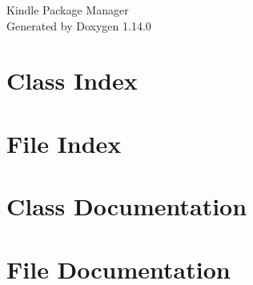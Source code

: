 \documentclass[twoside]{book}
\newcommand{\+}{\discretionary{\mbox{\scriptsize$\hookleftarrow$}}{}{}}
\newcommand{\clearemptydoublepage}{%
    \newpage{\pagestyle{empty}\cleardoublepage}%
  }
\begin{document}
  \raggedbottom
    \hypersetup{pageanchor=false,
                bookmarksnumbered=true,
                pdfencoding=unicode
               }
  \begin{titlepage}
  \vspace*{7cm}
  \begin{center}%
  {\Large Kindle Package Manager}\\
  \vspace*{1cm}
  {\large Generated by Doxygen 1.14.0}\\
  \end{center}
  \end{titlepage}
  \clearemptydoublepage
  \tableofcontents
  \clearemptydoublepage
  \hypersetup{pageanchor=true}



\chapter{Class Index}

\chapter{File Index}

\chapter{Class Documentation}










\chapter{File Documentation}





  \backmatter
  \newpage
  \clearemptydoublepage
  \printindex
\end{document}
